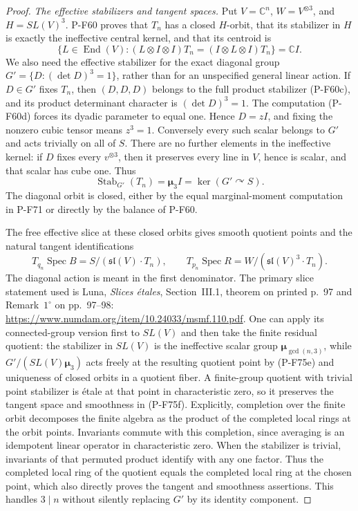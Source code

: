 \begin{proof}
\emph{The effective stabilizers and tangent spaces.}
Put $V=\mathbb C^n$, $W=V^{\otimes3}$, and
$H=SL(V)^3$.  P-F60 proves that $T_n$ has a closed
$H$-orbit, that its stabilizer in $H$ is exactly the
ineffective central kernel, and that its centroid is
\[
 \{L\in\operatorname{End}(V):(L\otimes I\otimes I)T_n
                  =(I\otimes L\otimes I)T_n\}=\mathbb C I.
                                                               \tag{P-F75d}
\]
We also need the effective stabilizer for the exact
diagonal group $G'=\{D:(\det D)^3=1\}$, rather than
for an unspecified general linear action.
If $D\in G'$ fixes $T_n$, then $(D,D,D)$ belongs to
the full product stabilizer (P-F60c), and its product
determinant character is $(\det D)^3=1$.
The computation (P-F60d) forces its dyadic parameter
to equal one.  Hence $D=zI$, and fixing the nonzero
cubic tensor means $z^3=1$.  Conversely every such
scalar belongs to $G'$ and acts trivially on all of $S$.
There are no further elements in the ineffective kernel:
if $D$ fixes every $v^{\otimes3}$, then it preserves
every line in $V$, hence is scalar, and that scalar
has cube one.  Thus
\[
 \operatorname{Stab}_{G'}(T_n)=\boldsymbol\mu_3 I
               =\ker(G'\curvearrowright S).
                                                               \tag{P-F75e}
\]
The diagonal orbit is closed, either by the equal
marginal-moment computation in P-F71 or directly by
the balance of P-F60.

The free effective slice at these closed orbits gives
smooth quotient points and the natural tangent
identifications
\[
 T_{q_n}\operatorname{Spec}B
       =S/(\mathfrak{sl}(V)\cdot T_n),\qquad
 T_{p_n}\operatorname{Spec}R
       =W/(\mathfrak{sl}(V)^3\cdot T_n).
                                                               \tag{P-F75f}
\]
The diagonal action is meant in the first denominator.
The primary slice statement used is Luna,
\emph{Slices \'etales}, Section~III.1, theorem on
printed p.~97 and Remark~$1^\circ$ on pp.~97--98:
\url{https://www.numdam.org/item/10.24033/msmf.110.pdf}.
One can apply its connected-group version first to
$SL(V)$ and then take the finite residual quotient:
the stabilizer in $SL(V)$ is the ineffective scalar
group $\boldsymbol\mu_{\gcd(n,3)}$, while
$G'/(SL(V)\boldsymbol\mu_3)$ acts freely at the
resulting quotient point by (P-F75e) and uniqueness
of closed orbits in a quotient fiber.
A finite-group quotient with trivial point stabilizer
is \'etale at that point in characteristic zero, so
it preserves the tangent space and smoothness in
(P-F75f).  Explicitly, completion over the finite orbit
decomposes the finite algebra as the product of the
completed local rings at the orbit points.  Invariants
commute with this completion, since averaging is an
idempotent linear operator in characteristic zero.
When the stabilizer is trivial, invariants of that
permuted product identify with any one factor.
Thus the completed local ring of the quotient equals
the completed local ring at the chosen point, which
also directly proves the tangent and smoothness assertions.
This handles $3\mid n$ without
silently replacing $G'$ by its identity component.


\end{proof}
